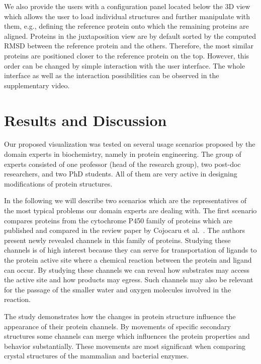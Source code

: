 \documentclass[twocolumn]{bmcart}%
\begin{document}
We also provide the users with a configuration panel located below the 3D view which allows the user to load individual structures and further manipulate with them, e.g., defining the reference protein onto which the remaining proteins are aligned.
Proteins in the juxtaposition view are by default sorted by the computed RMSD between the reference protein and the others.
Therefore, the most similar proteins are positioned closer to the reference protein on the top.
However, this order can be changed by simple interaction with the user interface.   
The whole interface as well as the interaction possibilities can be observed in the supplementary video.

\section*{Results and Discussion}
Our proposed visualization was tested on several usage scenarios proposed by the domain experts in biochemistry, namely in protein engineering.
The group of experts consisted of one professor (head of the research group), two post-doc researchers, and two PhD students.
All of them are very active in designing modifications of protein structures.

In the following we will describe two scenarios which are the representatives of the most typical problems our domain experts are dealing with.
The first scenario compares proteins from the cytochrome P450 family of proteins which are published and compared in the review paper by Cojocaru et al.~\cite{Cojocaru2007}. 
The authors present newly revealed channels in this family of proteins.
Studying these channels is of high interest because they can serve for transportation of ligands to the protein active site where a chemical reaction between the protein and ligand can occur.
By studying these channels we can reveal how substrates may access the active site and how products may egress. 
Such channels may also be relevant for the passage of the smaller water and oxygen molecules involved in the reaction. 

The study demonstrates how the changes in protein structure influence the appearance of their protein channels.
By movements of specific secondary structures some channels can merge which influences the protein properties and behavior substantially.
These movements are most significant when comparing crystal structures of the mammalian and bacterial enzymes.
\end{document}
